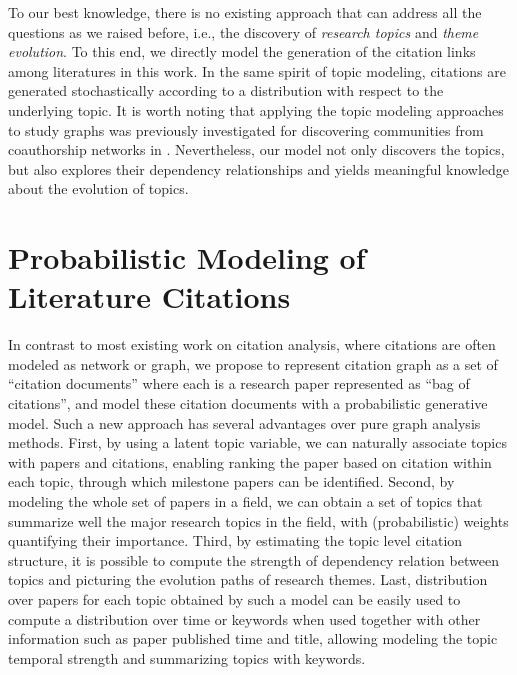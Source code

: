 To our best knowledge, there is no existing approach that can address all the
questions as we raised before, i.e., the discovery of \emph{research topics} and
\emph{theme evolution}. To this end, we directly model the generation of the
citation links among literatures in this work. In the same spirit of topic
modeling, citations are generated stochastically according to a distribution
with respect to the underlying topic. It is worth noting that applying the topic
modeling approaches to study graphs was previously investigated for discovering
communities from coauthorship networks in
\cite{henderson2009applying,zhang2007lda}. Nevertheless, our model not only
discovers the topics, but also explores their dependency relationships and
yields meaningful knowledge about the evolution of topics.

\section{Probabilistic Modeling of Literature
Citations}\label{sec::citation-model}

In contrast to most existing work on citation analysis, where citations are
often modeled as network or graph, we propose to represent citation graph as a
set of ``citation documents'' where each is a research paper represented as
``bag of citations'', and model these citation documents with a probabilistic
generative model.  Such a new approach has several advantages over pure graph
analysis methods.  First, by using a latent topic variable, we can naturally
associate topics with papers and citations, enabling ranking the paper based on
citation within each topic, through which milestone papers can be identified.
Second, by modeling the whole set of papers in a field, we can obtain a set of
topics that summarize well the major research topics in the field, with
(probabilistic) weights quantifying their importance.  Third, by estimating the
topic level citation structure, it is possible to compute the strength of
dependency relation between topics and picturing the evolution paths of research
themes.  Last, distribution over papers for each topic obtained by such a model
can be easily used to compute a distribution over time or keywords when used
together with other information such as paper published time and title, allowing
modeling the topic temporal strength and summarizing topics with keywords.

